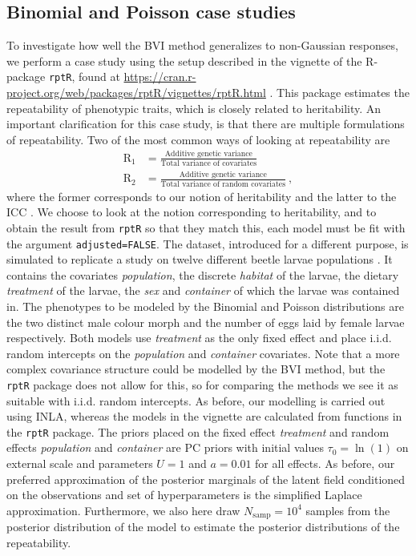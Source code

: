 \subsection{Binomial and Poisson case studies}
To investigate how well the BVI method generalizes to non-Gaussian responses, we perform a case study using the setup described in the vignette of the R-package \texttt{rptR}, found at \url{https://cran.r-project.org/web/packages/rptR/vignettes/rptR.html} \citep{Stoffel2017rptR}. This package estimates the repeatability of phenotypic traits, which is closely related to heritability. An important clarification for this case study, is that there are multiple formulations of repeatability. Two of the most common ways of looking at repeatability are
\begin{equation}
    \begin{aligned}
        \text{R}_1 &= \frac{\text{Additive genetic variance}}{\text{Total variance of covariates}} \\
        \text{R}_2 &= \frac{\text{Additive genetic variance}}{\text{Total variance of random covariates}} \ ,
    \end{aligned}
\end{equation}
where the former corresponds to our notion of heritability \citep{Stoffel2017rptR} and the latter to the ICC \citep{GLMM_book}. We choose to look at the notion corresponding to heritability, and to obtain the result from \texttt{rptR} so that they match this, each model must be fit with the argument \texttt{adjusted=FALSE}. The dataset, introduced for a different purpose, is simulated to replicate a study on twelve different beetle larvae populations \citep{Stoffel2017rptR}. It contains the covariates \textit{population}, the discrete \textit{habitat} of the larvae, the dietary \textit{treatment} of the larvae, the \textit{sex} and \textit{container} of which the larvae was contained in. The phenotypes to be modeled by the Binomial and Poisson distributions are the two distinct male colour morph and the number of eggs laid by female larvae respectively. Both models use \textit{treatment} as the only fixed effect and place i.i.d. random intercepts on the \textit{population} and \textit{container} covariates. Note that a more complex covariance structure could be modelled by the BVI method, but the \texttt{rptR} package does not allow for this, so for comparing the methods we see it as suitable with i.i.d. random intercepts. As before, our modelling is carried out using INLA, whereas the models in the vignette are calculated from functions in the \texttt{rptR} package. The priors placed on the fixed effect \textit{treatment} and random effects \textit{population} and \textit{container} are PC priors with initial values $\tau_0=\ln(1)$ on external scale and parameters $U=1$ and $a=0.01$ for all effects. As before, our preferred approximation of the posterior marginals of the latent field conditioned on the observations and set of hyperparameters is the simplified Laplace approximation. Furthermore, we also here draw $N_{\text{samp}}=10^4$ samples from the posterior distribution of the model to estimate the posterior distributions of the repeatability. 


